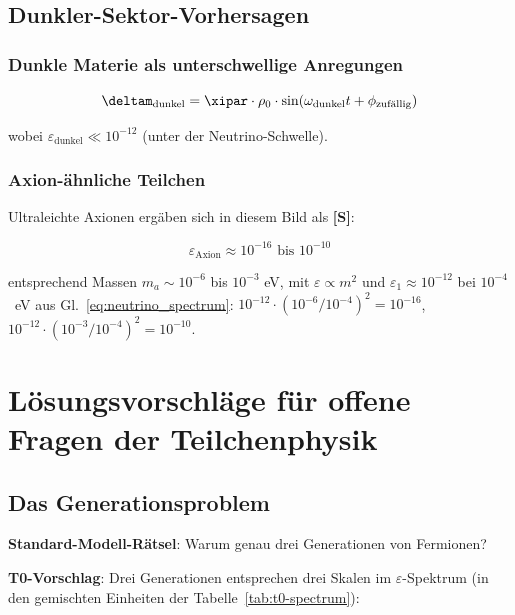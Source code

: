 	\subsection{Dunkler-Sektor-Vorhersagen}
	
	\subsubsection{Dunkle Materie als unterschwellige Anregungen}
	
	\begin{equation}
		\deltam_{\text{dunkel}} = \xipar \cdot \rho_0 \cdot \sin(\omega_{\text{dunkel}} t + \phi_{\text{zufällig}})
		\label{eq:dark_matter_field}
	\end{equation}
	
	wobei $\varepsilon_{\text{dunkel}} \ll 10^{-12}$ (unter der Neutrino-Schwelle).
	
	\subsubsection{Axion-ähnliche Teilchen}
	
	Ultraleichte Axionen ergäben sich in diesem Bild als \textbf{[S]}:
	
	\begin{equation}
		\varepsilon_{\text{Axion}} \approx 10^{-16} \text{ bis } 10^{-10}
		\label{eq:axion_epsilon}
	\end{equation}
	
	entsprechend Massen $m_a \sim 10^{-6}$ bis $10^{-3}$ eV, mit $\varepsilon \propto m^2$ und $\varepsilon_1 \approx 10^{-12}$ bei $10^{-4}$~eV aus Gl.~\eqref{eq:neutrino_spectrum}: $10^{-12}\cdot(10^{-6}/10^{-4})^2 = 10^{-16}$, $10^{-12}\cdot(10^{-3}/10^{-4})^2 = 10^{-10}$.
	
	\section{Lösungsvorschläge für offene Fragen der Teilchenphysik}
	
	\subsection{Das Generationsproblem}
	
	\textbf{Standard-Modell-Rätsel}: Warum genau drei Generationen von Fermionen?
	
	\textbf{T0-Vorschlag}: Drei Generationen entsprechen drei Skalen im $\varepsilon$-Spektrum (in den gemischten Einheiten der Tabelle~\ref{tab:t0-spectrum}):
	
